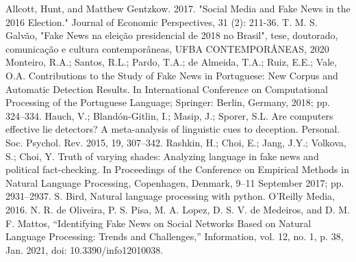 \documentclass[conference]{IEEEtran}
\begin{document}
\begin{thebibliography}{00}
 Allcott, Hunt, and Matthew Gentzkow. 2017. "Social Media and Fake News in the 2016 Election." Journal of Economic Perspectives, 31 (2): 211-36.
 T. M. S. Galvão, "Fake News na eleição presidencial de 2018 no Brasil", tese, doutorado, comunicação e cultura contemporâneas, UFBA
CONTEMPORÂNEAS, 2020
 Monteiro, R.A.; Santos, R.L.; Pardo, T.A.; de Almeida, T.A.; Ruiz, E.E.; Vale, O.A. Contributions to the Study of Fake News in
Portuguese: New Corpus and Automatic Detection Results. In International Conference on Computational Processing of the Portuguese
Language; Springer: Berlin, Germany, 2018; pp. 324–334.
 Hauch, V.; Blandón-Gitlin, I.; Masip, J.; Sporer, S.L. Are computers effective lie detectors? A meta-analysis of linguistic cues to
deception. Personal. Soc. Psychol. Rev. 2015, 19, 307–342.
 Rashkin, H.; Choi, E.; Jang, J.Y.; Volkova, S.; Choi, Y. Truth of varying shades: Analyzing language in fake news and political
fact-checking. In Proceedings of the Conference on Empirical Methods in Natural Language Processing, Copenhagen, Denmark,
9–11 September 2017; pp. 2931–2937.
 S. Bird, Natural language processing with python. O'Reilly Media, 2016. 
 N. R. de Oliveira, P. S. Pisa, M. A. Lopez, D. S. V. de Medeiros, and D. M. F. Mattos, “Identifying Fake News on Social Networks Based on Natural Language Processing: Trends and Challenges,” Information, vol. 12, no. 1, p. 38, Jan. 2021, doi: 10.3390/info12010038.
\end{thebibliography}
\vspace{12pt}
\color{red}
\end{document}
